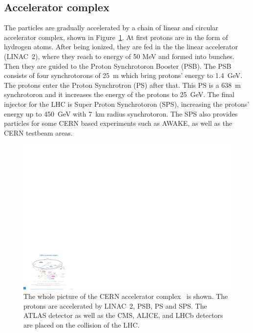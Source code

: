 \subsection{Accelerator complex}
The particles are gradually accelerated by a chain of linear and circular accelerator complex, shown in Figure~\ref{fig:accelerator}. At first protons are in the form of hydrogen atoms. After being ionized, they are fed in the the linear accelerator (LINAC~2), where they reach to energy of 50 MeV and formed into bunches. Then they are guided to the Proton Synchrotoron Booster (PSB). The PSB consists of four synchrotorons of 25~m which bring protons' energy to 1.4~GeV. The protons enter the Proton Synchrotron (PS) after that. This PS is a 638~m synchrotoron and it increases the energy of the protons to 25~GeV. The final injector for the LHC is Super Proton Synchrotoron (SPS), increasing the protons' energy up to 450~GeV with 7~km radius synchrotoron. The SPS also provides particles for some CERN based experiments such as AWAKE, as well as the CERN testbeam areas. \\
\begin{figure}[tbp]
\begin{center}
 \includegraphics[width=1.1\textwidth,keepaspectratio]{figures/detector/CERN}
\caption{
The whole picture of the CERN accelerator complex~\cite{accelerator} is shown. The protons are accelerated by LINAC~2, PSB, PS and SPS.
The ATLAS detector as well as the CMS, ALICE, and LHCb detectors are placed on the collision of the LHC.
}
\label{fig:accelerator}
\end{center}
\end{figure}

